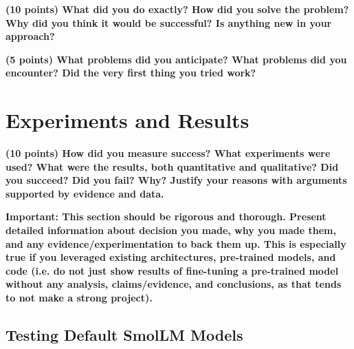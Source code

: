 \documentclass[10pt,twocolumn,letterpaper]{article}
\begin{document}
\textbf{(10 points) What did you do exactly? How did you solve the problem? Why did you think it would be successful? Is anything new in your approach? }

\textbf{(5 points) What problems did you anticipate? What problems did you encounter? Did the very first thing you tried work? }



\section{Experiments and Results}
\textbf{(10 points) How did you measure success? What experiments were used? What were the results, both quantitative and qualitative? Did you succeed? Did you fail? Why? Justify your reasons with arguments supported by evidence and data.}

\textbf{Important: This section should be rigorous and thorough. Present detailed information about decision you made, why you made them, and any evidence/experimentation to back them up. This is especially true if you leveraged existing architectures, pre-trained models, and code (i.e. do not just show results of fine-tuning a pre-trained model without any analysis, claims/evidence, and conclusions, as that tends to not make a strong project). }

\subsection{Testing Default SmolLM Models}








\end{document}
